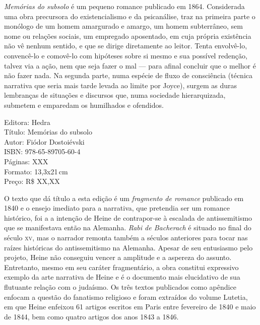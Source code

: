 
\noindent{}\textit{Memórias do subsolo} é um pequeno romance publicado em 1864. Considerada uma obra precursora do existencialismo e da psicanálise, traz na primeira parte o monólogo de um homem amargurado e amargo, um homem subterrâneo, sem nome ou relações sociais, um empregado aposentado, em cuja própria existência não vê nenhum sentido, e que se dirige diretamente ao leitor. Tenta envolvê-lo, convencê-lo e comovê-lo com hipóteses sobre si mesmo e sua possível redenção, talvez via a ação, nem que seja fazer o mal --- para afinal concluir que o melhor é não fazer nada. Na segunda parte, numa espécie de fluxo de consciência (técnica narrativa que seria mais tarde levada ao limite por Joyce), surgem as duras lembranças de situações e discursos que, numa sociedade hierarquizada, submetem e emparedam os humilhados e ofendidos.


\begin{ficha}
Editora: Hedra\\
Título: Memórias do subsolo\\
Autor: Fiódor Dostoiévski\\ 
ISBN: 978-65-89705-60-4\\
Páginas: XXX\\
Formato: 13,3x21\,cm\\
Preço: R\$ XX,XX\\
\end{ficha}

\pagebreak


\noindent{}O texto que dá título a esta edição é um \textit{fragmento de romance} publicado em 1840 e o ensejo imediato para a narrativa, que pretendia ser um romance histórico, foi a a intenção de Heine de contrapor-se à escalada de antissemitismo que se manifestava então na Alemanha. \textit{Rabi de Bacherach} é situado no final do século \textsc{xv}, mas o narrador remonta também a séculos anteriores para tocar nas raízes históricas do antissemitismo na Alemanha. Apesar de seu entusiasmo pelo projeto, Heine não conseguiu vencer a amplitude e a aspereza do assunto. Entretanto, mesmo em seu caráter fragmentário, a obra constitui expressivo exemplo da arte narrativa de Heine e é o documento mais elucidativo de sua flutuante relação com o judaísmo. Os três textos publicados como apêndice enfocam a questão do fanatismo religioso e foram extraídos do volume Lutetia, em que Heine enfeixou 61 artigos escritos em Paris entre fevereiro de 1840 e maio de 1844, bem como quatro artigos dos anos 1843 a 1846.

